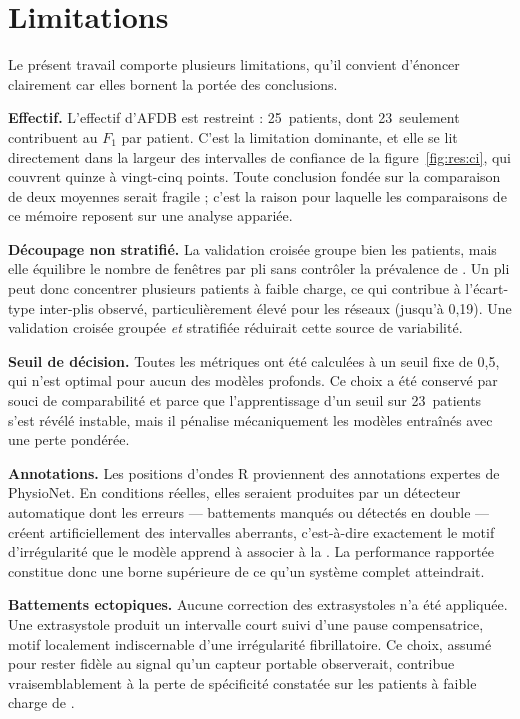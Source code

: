 \section{Limitations}
\label{sec:disc:limites}

Le présent travail comporte plusieurs limitations, qu'il convient d'énoncer clairement car elles bornent la portée des conclusions.

\textbf{Effectif.} L'effectif d'AFDB est restreint : 25~patients, dont 23~seulement contribuent au \(F_1\) par patient. C'est la limitation dominante, et elle se lit directement dans la largeur des intervalles de confiance de la figure~\ref{fig:res:ci}, qui couvrent quinze à vingt-cinq points. Toute conclusion fondée sur la comparaison de deux moyennes serait fragile ; c'est la raison pour laquelle les comparaisons de ce mémoire reposent sur une analyse appariée.

\textbf{Découpage non stratifié.} La validation croisée groupe bien les patients, mais elle équilibre le nombre de fenêtres par pli sans contrôler la prévalence de \FA{}. Un pli peut donc concentrer plusieurs patients à faible charge, ce qui contribue à l'écart-type inter-plis observé, particulièrement élevé pour les réseaux (jusqu'à 0,19). Une validation croisée groupée \emph{et} stratifiée réduirait cette source de variabilité.

\textbf{Seuil de décision.} Toutes les métriques ont été calculées à un seuil fixe de 0,5, qui n'est optimal pour aucun des modèles profonds. Ce choix a été conservé par souci de comparabilité et parce que l'apprentissage d'un seuil sur 23~patients s'est révélé instable, mais il pénalise mécaniquement les modèles entraînés avec une perte pondérée.

\textbf{Annotations.} Les positions d'ondes R proviennent des annotations expertes de PhysioNet. En conditions réelles, elles seraient produites par un détecteur automatique dont les erreurs — battements manqués ou détectés en double — créent artificiellement des intervalles \RR{} aberrants, c'est-à-dire exactement le motif d'irrégularité que le modèle apprend à associer à la \FA{}. La performance rapportée constitue donc une borne supérieure de ce qu'un système complet atteindrait.

\textbf{Battements ectopiques.} Aucune correction des extrasystoles n'a été appliquée. Une extrasystole produit un intervalle court suivi d'une pause compensatrice, motif localement indiscernable d'une irrégularité fibrillatoire. Ce choix, assumé pour rester fidèle au signal qu'un capteur portable observerait, contribue vraisemblablement à la perte de spécificité constatée sur les patients à faible charge de \FA{}.

